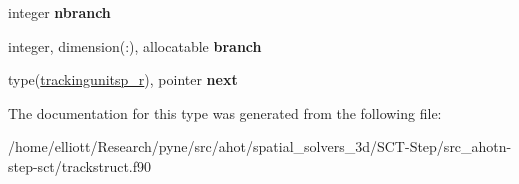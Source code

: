 \begin{DoxyCompactItemize}
\item 
\hypertarget{structtracking__data__structures_1_1trackingunitsp__r_a5378c801096551d6d507eb04dd011a6c}{integer {\bfseries nbranch}}\label{structtracking__data__structures_1_1trackingunitsp__r_a5378c801096551d6d507eb04dd011a6c}

\item 
\hypertarget{structtracking__data__structures_1_1trackingunitsp__r_a190f4625d2f13828b2f02ca184121c79}{integer, dimension(\-:), allocatable {\bfseries branch}}\label{structtracking__data__structures_1_1trackingunitsp__r_a190f4625d2f13828b2f02ca184121c79}

\item 
\hypertarget{structtracking__data__structures_1_1trackingunitsp__r_a24d8fb2d7521637baa6381200f4fd753}{type(\hyperlink{structtracking__data__structures_1_1trackingunitsp__r}{trackingunitsp\-\_\-r}), pointer {\bfseries next}}\label{structtracking__data__structures_1_1trackingunitsp__r_a24d8fb2d7521637baa6381200f4fd753}

\end{DoxyCompactItemize}


The documentation for this type was generated from the following file\-:\begin{DoxyCompactItemize}
\item 
/home/elliott/\-Research/pyne/src/ahot/spatial\-\_\-solvers\-\_\-3d/\-S\-C\-T-\/\-Step/src\-\_\-ahotn-\/step-\/sct/trackstruct.\-f90\end{DoxyCompactItemize}
